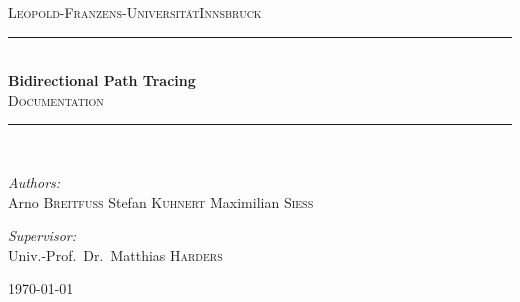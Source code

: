 \begin{titlepage}

\begin{center}   

\textsc{\LARGE Leopold-Franzens-Universit\"{a}t\newline\newline Innsbruck}\\[1.5cm]

\newcommand{\HRule}{\rule{\linewidth}{0.5mm}}
\HRule \\[0.4cm]
{ \huge \bfseries Bidirectional Path Tracing}\\[0.4cm]

\textsc{\Large Documentation}\\[0.5cm]

\HRule \\[1.5cm]

\begin{minipage}{0.4\textwidth}
\begin{flushleft} \large
\emph{Authors:}\\
Arno \textsc{Breitfuss}
\newline
Stefan \textsc{Kuhnert}
\newline
Maximilian \textsc{Siess}
\newline
\end{flushleft}
\end{minipage}
\hfill
\begin{minipage}{0.4\textwidth}
\begin{flushright} \large
\emph{Supervisor:} \\
Univ.-Prof.~Dr.~Matthias \textsc{Harders}
\end{flushright}
\end{minipage}

\vfill

{\large \today}

\end{center}

\end{titlepage}